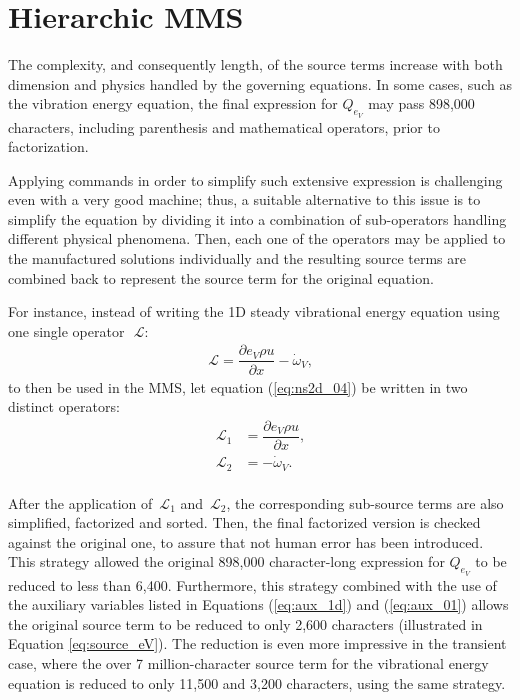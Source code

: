 \documentclass[10pt]{article}
\newcommand{\Diff}[2] {\dfrac{\partial( #1)}{\partial #2}}
\newcommand{\diff}[2] {\dfrac{\partial #1 }{\partial #2}}
\newcommand{\bv}[1]{\ensuremath{\mbox{\boldmath$ #1 $}}}
\newcommand{\Lo}{\,\mathcal{L}}
\begin{document}
\section{Hierarchic MMS}

The complexity, and consequently length, of the source terms increase with both dimension and physics handled by the governing equations. In some cases, such as the vibration energy equation, the final expression for $Q_{e_V}$ may pass 898,000 characters, including parenthesis and mathematical operators, prior to factorization.

Applying commands in order to simplify such extensive expression is challenging even with a very good machine; thus, a suitable alternative to this issue is to simplify the equation by dividing it into a combination of sub-operators handling different physical phenomena. Then, each one of the operators may be applied to the manufactured solutions individually and the resulting source terms are combined back to represent the source term for the original equation.


For instance, instead of writing the 1D steady vibrational energy equation using one single operator~$\Lo$:
\begin{equation}
 \label{eq:ns2d_04}
\begin{split}
\Lo= \diff{e_V \rho u }{x} -\dot{\omega}_V ,
\end{split}
\end{equation}
to then be used in the MMS, let equation (\ref{eq:ns2d_04}) be written in two distinct operators:
\begin{equation*}
 \begin{split}
  \Lo_1&=\diff{e_V \rho u }{x},\\
  \Lo_2&= -\dot{\omega}_V.\\
   \end{split}
\end{equation*}

After the application of $\Lo_1$ and  $\Lo_2$,  the corresponding sub-source terms are also simplified, factorized and sorted. Then, the final factorized version is checked against the original one, to assure that not human error has been introduced.  This strategy  allowed the original  898,000 character-long  expression for $Q_{e_V}$ to be reduced to less than 6,400. Furthermore, this strategy combined with the use of the auxiliary variables listed in Equations (\ref{eq:aux_1d}) and (\ref{eq:aux_01}) allows the original source term to be reduced to only 2,600 characters (illustrated in Equation \ref{eq:source_eV}). The reduction is even more impressive in the transient case, where the over 7 million-character source term for the vibrational energy equation is reduced to only 11,500 and 3,200 characters, using the same strategy.
\end{document}
